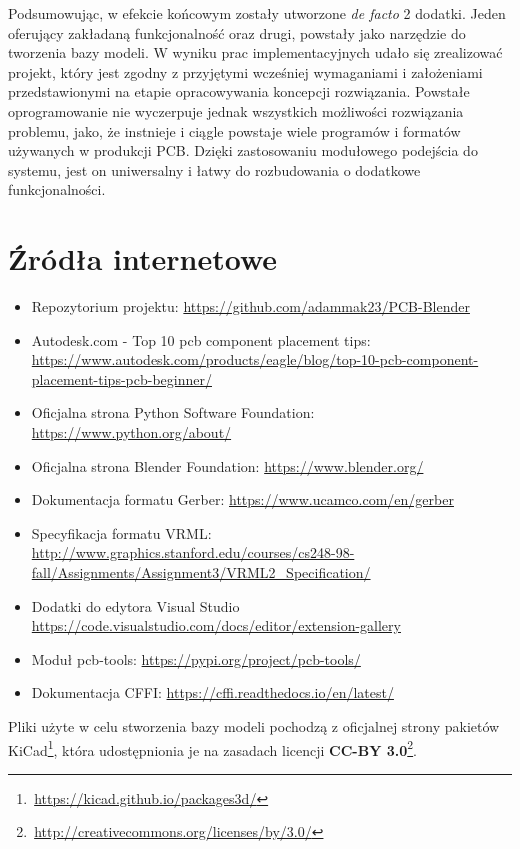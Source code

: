 \documentclass{xmgr}
\begin{document}
Podsumowując, w efekcie końcowym zostały utworzone \emph{de facto} 2 dodatki. Jeden oferujący zakładaną funkcjonalność oraz drugi, powstały jako narzędzie do tworzenia bazy modeli. W wyniku prac implementacyjnych udało się zrealizować projekt, który jest zgodny z przyjętymi wcześniej wymaganiami i założeniami przedstawionymi na etapie opracowywania koncepcji rozwiązania. Powstałe oprogramowanie nie wyczerpuje jednak wszystkich możliwości rozwiązania problemu, jako, że instnieje i ciągle powstaje wiele programów i formatów używanych w produkcji PCB. Dzięki zastosowaniu modułowego podejścia do systemu, jest on uniwersalny i łatwy do rozbudowania o dodatkowe funkcjonalności.






\listoffigures

\appendix
\chapter{Źródła internetowe} \label{linki}
\begin{itemize}
\item Repozytorium projektu: \url{https://github.com/adammak23/PCB-Blender}
\item Autodesk.com - Top 10 pcb component placement tips: \url{https://www.autodesk.com/products/eagle/blog/top-10-pcb-component-placement-tips-pcb-beginner/}
\item Oficjalna strona Python Software Foundation: \url{https://www.python.org/about/}
\item Oficjalna strona Blender Foundation: \url{https://www.blender.org/}
\item Dokumentacja formatu Gerber: \url{https://www.ucamco.com/en/gerber}
\item Specyfikacja formatu VRML: \url{http://www.graphics.stanford.edu/courses/cs248-98-fall/Assignments/Assignment3/VRML2_Specification/}
\item Dodatki do edytora Visual Studio \url{https://code.visualstudio.com/docs/editor/extension-gallery}
\item Moduł pcb-tools: \url{https://pypi.org/project/pcb-tools/}
\item Dokumentacja CFFI: \url{https://cffi.readthedocs.io/en/latest/}
\end{itemize}

\noindent Pliki użyte w celu stworzenia bazy modeli pochodzą z oficjalnej strony pakietów KiCad\footnote{\,\url{https://kicad.github.io/packages3d/}}, która udostępnionia je na zasadach licencji \textbf{CC-BY 3.0}\footnote{\,\url{http://creativecommons.org/licenses/by/3.0/}}.
\vspace{5mm}


\oswiadczenie
\end{document}
